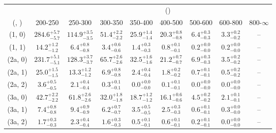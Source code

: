 \begin{table}[h!]
\tiny
\centering
{}
\begin{tabular}
{ccccccccc}
	\hline\hline
&	& \multicolumn{8}{c}{\scalht (\gev)} \\ 
	 (\njet,  \nb) & 200-250 & 250-300 & 300-350 & 350-400 & 400-500 & 500-600 & 600-800 & 800-$\infty$ \\ [0.8ex] 
\hline
	(1, 0) & $284.6^{+ 5.7 }_{- 5.7 }$ & $114.9^{+ 3.5 }_{- 3.5 }$ & $51.4^{+ 2.2 }_{- 2.2 }$ & $25.9^{+ 1.4 }_{- 1.4 }$ & $20.3^{+ 0.8 }_{- 0.8 }$ & $6.4^{+ 0.3 }_{- 0.3 }$ & $3.3^{+ 0.2 }_{- 0.2 }$ & -- \\[0.5ex] 
	(1, 1) & $14.2^{+ 1.2 }_{- 1.2 }$ & $6.4^{+ 0.8 }_{- 0.8 }$ & $3.4^{+ 0.6 }_{- 0.6 }$ & $1.4^{+ 0.3 }_{- 0.3 }$ & $0.8^{+ 0.1 }_{- 0.1 }$ & $0.2^{+ 0.0 }_{- 0.0 }$ & $0.2^{+ 0.0 }_{- 0.0 }$ & -- \\[0.5ex] 
	(2a, 0) & $231.7^{+ 5.1 }_{- 5.1 }$ & $128.3^{+ 3.7 }_{- 3.7 }$ & $65.7^{+ 2.6 }_{- 2.6 }$ & $32.5^{+ 1.6 }_{- 1.6 }$ & $21.2^{+ 0.7 }_{- 0.7 }$ & $6.9^{+ 0.3 }_{- 0.3 }$ & $3.5^{+ 0.2 }_{- 0.2 }$ & -- \\[0.5ex] 
	(2a, 1) & $25.0^{+ 1.5 }_{- 1.5 }$ & $13.3^{+ 1.2 }_{- 1.2 }$ & $6.9^{+ 0.8 }_{- 0.8 }$ & $2.4^{+ 0.4 }_{- 0.4 }$ & $1.8^{+ 0.2 }_{- 0.2 }$ & $0.7^{+ 0.1 }_{- 0.1 }$ & $0.5^{+ 0.2 }_{- 0.2 }$ & -- \\[0.5ex] 
	(2a, 2) & $3.6^{+ 0.5 }_{- 0.5 }$ & $2.1^{+ 0.4 }_{- 0.4 }$ & $0.3^{+ 0.1 }_{- 0.1 }$ & $0.0^{+ 0.0 }_{- 0.0 }$ & $0.1^{+ 0.1 }_{- 0.1 }$ & $0.0^{+ 0.0 }_{- 0.0 }$ & $0.0^{+ 0.0 }_{- 0.0 }$ & -- \\[0.5ex] 
	(3a, 0) & $42.7^{+ 2.2 }_{- 2.2 }$ & $61.8^{+ 2.6 }_{- 2.6 }$ & $32.0^{+ 1.8 }_{- 1.8 }$ & $18.7^{+ 1.2 }_{- 1.2 }$ & $16.1^{+ 0.6 }_{- 0.6 }$ & $4.5^{+ 0.2 }_{- 0.2 }$ & $2.1^{+ 0.1 }_{- 0.1 }$ & -- \\[0.5ex] 
	(3a, 1) & $7.4^{+ 0.8 }_{- 0.8 }$ & $9.4^{+ 0.9 }_{- 0.9 }$ & $6.2^{+ 0.7 }_{- 0.7 }$ & $3.5^{+ 0.5 }_{- 0.5 }$ & $2.5^{+ 0.3 }_{- 0.3 }$ & $0.6^{+ 0.1 }_{- 0.1 }$ & $0.3^{+ 0.0 }_{- 0.0 }$ & -- \\[0.5ex] 
	(3a, 2) & $1.7^{+ 0.3 }_{- 0.3 }$ & $2.3^{+ 0.4 }_{- 0.4 }$ & $1.6^{+ 0.3 }_{- 0.3 }$ & $0.5^{+ 0.1 }_{- 0.1 }$ & $0.6^{+ 0.1 }_{- 0.1 }$ & $0.2^{+ 0.1 }_{- 0.1 }$ & $0.0^{+ 0.0 }_{- 0.0 }$ & -- \\[0.5ex] 

\end{tabular}
\end{table}
